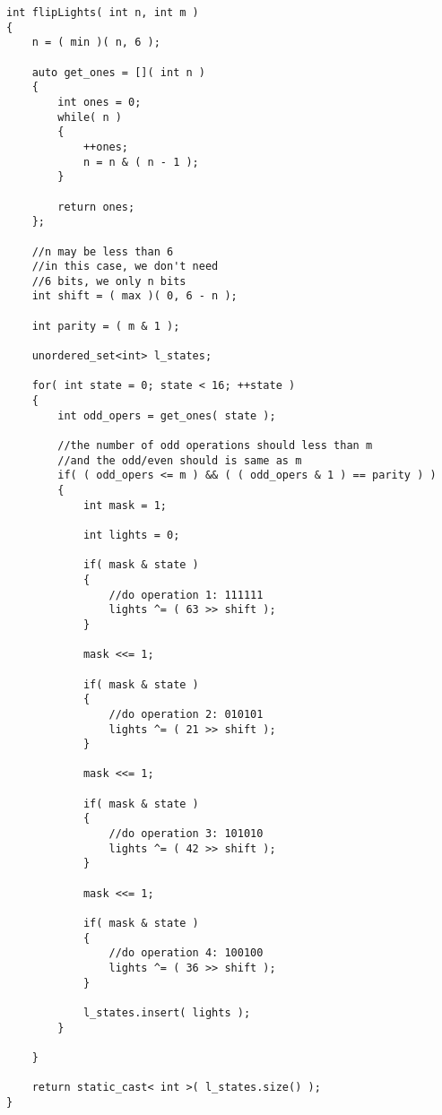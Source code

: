 \setcounter{lstlisting}{0}
\begin{lstlisting}[style=customc, caption={Reduce Search Space}]
int flipLights( int n, int m )
{
    n = ( min )( n, 6 );

    auto get_ones = []( int n )
    {
        int ones = 0;
        while( n )
        {
            ++ones;
            n = n & ( n - 1 );
        }

        return ones;
    };

    //n may be less than 6
    //in this case, we don't need
    //6 bits, we only n bits
    int shift = ( max )( 0, 6 - n );

    int parity = ( m & 1 );

    unordered_set<int> l_states;

    for( int state = 0; state < 16; ++state )
    {
        int odd_opers = get_ones( state );

        //the number of odd operations should less than m
        //and the odd/even should is same as m
        if( ( odd_opers <= m ) && ( ( odd_opers & 1 ) == parity ) )
        {
            int mask = 1;

            int lights = 0;

            if( mask & state )
            {
                //do operation 1: 111111
                lights ^= ( 63 >> shift );
            }

            mask <<= 1;

            if( mask & state )
            {
                //do operation 2: 010101
                lights ^= ( 21 >> shift );
            }

            mask <<= 1;

            if( mask & state )
            {
                //do operation 3: 101010
                lights ^= ( 42 >> shift );
            }

            mask <<= 1;

            if( mask & state )
            {
                //do operation 4: 100100
                lights ^= ( 36 >> shift );
            }

            l_states.insert( lights );
        }

    }

    return static_cast< int >( l_states.size() );
}
\end{lstlisting}


